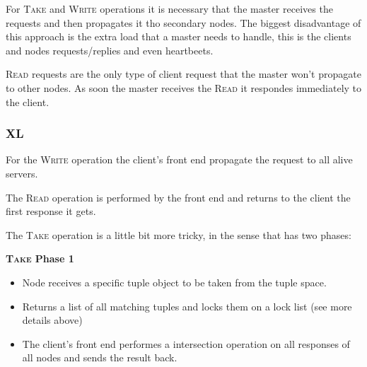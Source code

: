 \documentclass[times, 10pt,twocolumn]{article}
\begin{document}
For \textsc{Take} and \textsc{Write} operations it is necessary that the master receives the requests
and then propagates it tho secondary nodes. The biggest disadvantage of this approach is the extra
load that a master needs to handle, this is the clients and nodes requests/replies and even heartbeets.


\textsc{Read} requests are the only type of client request that the master won't propagate to other nodes.
As soon the master receives the \textsc{Read} it respondes immediately to the client.


\subsubsection{XL}


For the \textsc{Write} operation the client's front end propagate the request to all alive servers.

The \textsc{Read} operation is performed by the front end and returns to the client the first response it gets.

The \textsc{Take} operation is a little bit more tricky, in the sense that has two phases:

\textbf{\textsc{Take} Phase 1}
\begin{itemize}
   \item Node receives a specific tuple object to be taken from the tuple space.
   \item Returns a list of all matching tuples and locks them on a lock list (see more details above)
   \item The client's front end performes a intersection operation on all responses of all nodes and sends the result
   back.
\end{itemize}
\end{document}
